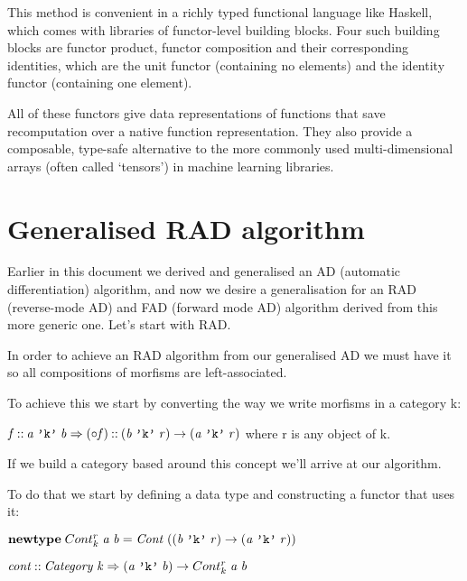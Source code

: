 \documentclass[11pt,a4]{article}
\newcommand{\Conid}[1]{\mathit{#1}}
\newcommand{\Varid}[1]{\mathit{#1}}
\theoremstyle{definition}
\theoremstyle{Definition}
\theoremstyle{Definition}
\begin{document}
	This method is convenient in a richly typed functional language like Haskell, which comes with libraries of functor-level building blocks. Four such building blocks are functor product, functor composition and their corresponding identities, which are the unit functor (containing no elements) and the identity functor (containing one element).
	\par All of these functors give data representations of functions that save recomputation over a native
	function representation. They also provide a composable, type-safe alternative to the more commonly used multi-dimensional arrays (often called \enquote*{tensors}) in machine learning libraries.

    
\newpage
    
\section{Generalised RAD algorithm}

Earlier in this document we derived and generalised an AD (automatic differentiation) algorithm, and now we desire a generalisation for an RAD (reverse-mode AD) and FAD (forward mode AD) algorithm derived from this more generic one. Let's start with RAD.

In order to achieve an RAD algorithm from our generalised AD we must have it so all compositions of morfisms are left-associated. 

To achieve this we start by converting the way we write morfisms in a category k:

\ensuremath{\Varid{f}\mathbin{::}\Varid{a}\;\text{\tt 'k'}\;\Varid{b}\Rightarrow(\mathbin{\circ}\Varid{f})\mathbin{::}(\Varid{b}\;\text{\tt 'k'}\;\Varid{r})\rightarrow (\Varid{a}\;\text{\tt 'k'}\;\Varid{r})} where r is any object of k.

If we build a category based around this concept we'll arrive at our algorithm.

To do that we start by defining a data type and constructing a functor that uses it:

\ensuremath{\mathbf{newtype}\;Cont^{r}_{k}\;\Varid{a}\;\Varid{b}\mathrel{=}\Conid{Cont}\;((\Varid{b}\;\text{\tt 'k'}\;\Varid{r})\rightarrow (\Varid{a}\;\text{\tt 'k'}\;\Varid{r}))}

\ensuremath{\Varid{cont}\mathbin{::}\Conid{Category}\;\Varid{k}\Rightarrow(\Varid{a}\;\text{\tt 'k'}\;\Varid{b})\rightarrow Cont^{r}_{k}\;\Varid{a}\;\Varid{b}}
\end{document}
